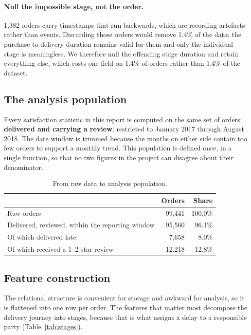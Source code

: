 \documentclass[11pt,a4paper]{article}
\begin{document}
\paragraph{Null the impossible stage, not the order.} 1{,}382 orders carry
timestamps that run backwards, which are recording artefacts rather than events.
Discarding those orders would remove 1.4\% of the data; the purchase-to-delivery
duration remains valid for them and only the individual stage is meaningless. We
therefore null the offending stage duration and retain everything else, which costs
one field on 1.4\% of orders rather than 1.4\% of the dataset.

\subsection{The analysis population}

Every satisfaction statistic in this report is computed on the same set of orders:
\textbf{delivered and carrying a review}, restricted to January 2017 through
August 2018. The date window is trimmed because the months on either side contain
too few orders to support a monthly trend. This population is defined once, in a
single function, so that no two figures in the project can disagree about their
denominator.

\begin{table}[H]
\centering
\small
\caption{From raw data to analysis population.}
\label{tab:population}
\begin{tabular}{@{}lrr@{}}
\toprule
& \textbf{Orders} & \textbf{Share}\\
\midrule
Raw orders & 99{,}441 & 100.0\%\\
Delivered, reviewed, within the reporting window & 95{,}560 & 96.1\%\\
\midrule
Of which delivered late & 7{,}658 & 8.0\%\\
Of which received a 1--2 star review & 12{,}218 & 12.8\%\\
\bottomrule
\end{tabular}
\end{table}

\subsection{Feature construction}

The relational structure is convenient for storage and awkward for analysis, so it
is flattened into one row per order. The features that matter most decompose the
delivery journey into stages, because that is what assigns a delay to a
responsible party (Table~\ref{tab:stages}).
\end{document}

